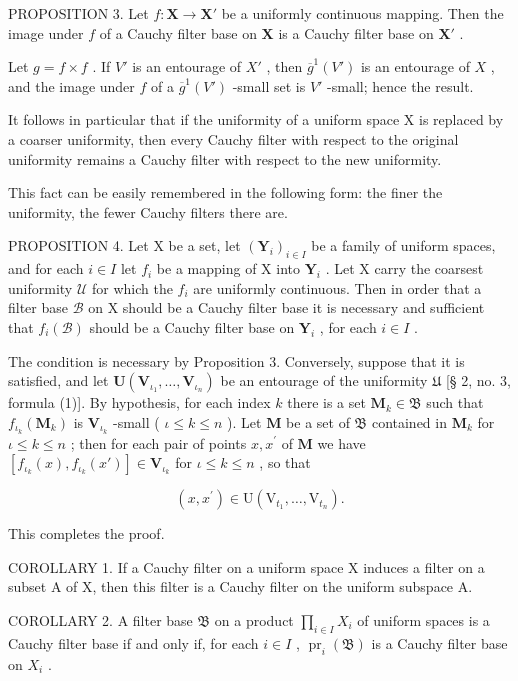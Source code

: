 PROPOSITION 3. Let \(f: \mathbf{X} \to \mathbf{X}'\) be a uniformly continuous mapping. Then the image under \(f\) of a Cauchy filter base on \(\mathbf{X}\) is a Cauchy filter base on \(\mathbf{X}'\) .

Let \(g = f \times f\) . If \(V'\) is an entourage of \(X'\) , then \(\overline{g}^1(V')\) is an entourage of \(X\) , and the image under \(f\) of a \(\overline{g}^1(V')\) -small set is \(V'\) -small; hence the result.

It follows in particular that if the uniformity of a uniform space X is replaced by a coarser uniformity, then every Cauchy filter with respect to the original uniformity remains a Cauchy filter with respect to the new uniformity.

This fact can be easily remembered in the following form: the finer the uniformity, the fewer Cauchy filters there are.

PROPOSITION 4. Let X be a set, let \((\mathbf{Y}_i)_{i\in I}\) be a family of uniform spaces, and for each \(i\in I\) let \(f_i\) be a mapping of X into \(\mathbf{Y}_i\) . Let X carry the coarsest uniformity \(\mathcal{U}\) for which the \(f_i\) are uniformly continuous. Then in order that a filter base \(\mathcal{B}\) on X should be a Cauchy filter base it is necessary and sufficient that \(f_i(\mathcal{B})\) should be a Cauchy filter base on \(\mathbf{Y}_i\) , for each \(i\in I\) .

The condition is necessary by Proposition 3. Conversely, suppose that it is satisfied, and let \(\mathbf{U}(\mathbf{V}_{\iota_1},\ldots ,\mathbf{V}_{\iota_n})\) be an entourage of the uniformity \(\mathfrak{U}\) {[}§ 2, no. 3, formula (1){]}. By hypothesis, for each index \(k\) there is a set \(\mathbf{M}_k\in \mathfrak{B}\) such that \(f_{\iota_k}(\mathbf{M}_k)\) is \(\mathbf{V}_{\iota_k}\) -small ( \(\iota \leqslant k\leqslant n\) ). Let \(\mathbf{M}\) be a set of \(\mathfrak{B}\) contained in \(\mathbf{M}_k\) for \(\iota \leqslant k\leqslant n\) ; then for each pair of points \(x,x^{\prime}\) of \(\mathbf{M}\) we have \([f_{\iota_k}(x),f_{\iota_k}(x')]\in \mathbf{V}_{\iota_k}\) for \(\iota \leqslant k\leqslant n\) , so that

\[
(x, x ^ {\prime}) \in \mathrm{U} (\mathrm{V} _ {t _ {1}}, \dots , \mathrm{V} _ {t _ {n}}).
\]

This completes the proof.

COROLLARY 1. If a Cauchy filter on a uniform space X induces a filter on a subset A of X, then this filter is a Cauchy filter on the uniform subspace A.

COROLLARY 2. A filter base \(\mathfrak{B}\) on a product \(\prod_{i\in I}X_i\) of uniform spaces is a Cauchy filter base if and only if, for each \(i\in I\) , \(\operatorname{pr}_i(\mathfrak{B})\) is a Cauchy filter base on \(X_i\) .

